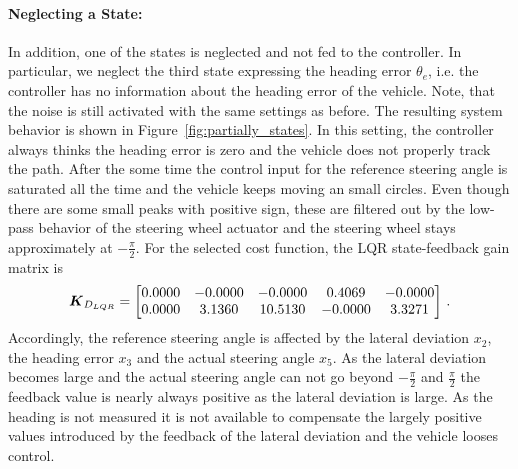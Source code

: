 \paragraph{Neglecting a State: } In addition, one of the states is neglected and not fed to the controller.
In particular, we neglect the third state expressing the heading error $\theta_e$, i.e. the controller has no information about the heading error of the vehicle.
Note, that the noise is still activated with the same settings as before.
The resulting system behavior is shown in Figure~\ref{fig:partially_states}.
In this setting, the controller always thinks the heading error is zero and the vehicle does not properly track the path.
After the some time the control input for the reference steering angle is saturated all the time and the vehicle keeps moving an small circles.
Even though there are some small peaks with positive sign, these are filtered out by the low-pass behavior of the steering wheel actuator and the steering wheel stays approximately at $-\frac{\pi}{2}$.
For the selected cost function, the LQR state-feedback gain matrix is
\begin{equation}
	\boldsymbol{K}_{D_{LQR}} = \begin{bmatrix}
	0.0000 &  -0.0000  & -0.0000  &  0.4069 &  -0.0000\\
    0.0000  &  3.1360 &  10.5130 &  -0.0000  &  3.3271	
	\end{bmatrix}\, .
\end{equation}
Accordingly, the reference steering angle is affected by the lateral deviation $x_2$, the heading error $x_3$ and the actual steering angle $x_5$. 
As the lateral deviation becomes large and the actual steering angle can not go beyond $-\frac{\pi}{2}$ and $\frac{\pi}{2}$ the feedback value is nearly always positive as the lateral deviation is large.
As the heading is not measured it is not available to compensate the largely positive values introduced by the feedback of the lateral deviation and the vehicle looses control.

